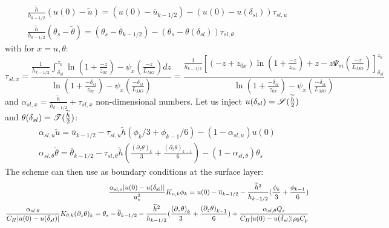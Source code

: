 \begin{equation} \label{eq:ND_Ocean_tmprelation_tilde_bar}
\begin{aligned}
	\frac{\widetilde{h}}{h_{k-1/2}} (u(0) - \widetilde{u}) =
	(u(0) - \overline{u}_{k-1/2}) -
	(u(0) - u(\delta_{sl}))\tau_{sl, u} \\
\frac{\widetilde{h}}{h_{k-1/2}} (\theta_s - \widetilde{\theta}) =
	(\theta_s - \overline{\theta}_{k-1/2}) -
	(\theta_s - \theta(\delta_{sl}))\tau_{sl, \theta}
\end{aligned}
\end{equation}
with for $x = u, \theta$:
\begin{equation}
	\tau_{sl, x} = \frac{\frac{1}{{h_{k-1/2}}}\int_{\delta_{sl}}^{z_k} \ln(1+\frac{-z}{z_{0x}})- \psi_x(\frac{-z}{L_{MO}})
	dz}{\ln(1+\frac{-\delta_{sl}}{z_{0x}})- \psi_x(\frac{-\delta_{sl}}{L_{MO}})
    }
    =
 \frac{\frac{1}{{h_{k-1/2}}}
    \left[
	    (-z+z_{0x})\ln(1+\frac{-z}{z_{0x}})+z
    -
    z \Psi_m(\frac{-z}{L_{MO}}) \right]_{\delta_{sl}}^{z_k}
    }{\ln(1+\frac{-\delta_{sl}}{z_{0x}})- \psi_x(\frac{-\delta_{sl}}{L_{MO}})
    }
\end{equation}
and
$\alpha_{sl, x} = \frac{\widetilde{h}}{h_{k-1/2}} +
\tau_{sl, x}$
non-dimensional numbers.
Let us inject $u(\delta_{sl}) =
{\cal S}(\frac{\widetilde{h}}{2})$ and
$\theta(\delta_{sl}) = {\cal T}(\frac{\widetilde{h}}{2})$:
\begin{equation}
\begin{aligned}
\label{eq:ND_Ocean_relation_tilde_bar}
\alpha_{sl, u}\widetilde{u} = \overline{u}_{k-1/2} -
	\tau_{sl, u}
\widetilde{h}
	(\phi_k/3 + \phi_{k-1}/6) - (1 - \alpha_{sl, u})u(0)\\
\alpha_{sl, \theta}
\widetilde{\theta}
= \overline{\theta}_{k-1/2} - \tau_{sl, \theta}
	\widetilde{h}(\frac{{(\partial_z \theta)}_k}{3} + \frac{{(\partial_z \theta)}_{k-1}}{6})
 - (1 - \alpha_{sl, \theta})\theta_s
\end{aligned}
\end{equation}
The scheme can then use as boundary conditions at the surface layer:
\begin{equation}
\label{eq:ND_Ocean_boundaryConditionFVfree}
\begin{aligned}
	\frac{\alpha_{\rm sl, u} |u(0) - u(\delta_{\rm sl})|}
	{u_\star^2}K_{u,k} \phi_k =
	u(0) - \overline{u}_{k-1/2} - \frac{\widetilde{h}^2}{h_{k-1/2}}
	(\frac{\phi_k}{3} + \frac{\phi_{k-1}}{6})
	\\
  \frac{\alpha_{sl, \theta} }
	{C_H |u(0)-u(\delta_{sl})|}
	K_{\theta, k} (\partial_z \theta)_k = 
  \theta_s - \overline{\theta}_{k-1/2} - \frac{\widetilde{h}^2}{h_{k-1/2}}
	(\frac{{(\partial_z \theta)}_k}{3} +
	\frac{{(\partial_z \theta)}_{k-1}}{6}) 
	+ \frac{\alpha_{sl, \theta} Q_s }
	{C_H |u(0)-u(\delta_{sl})| \rho_0 C_p}
  \\
\end{aligned}
\end{equation}
